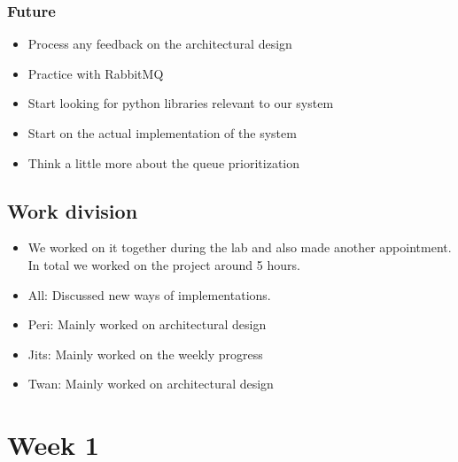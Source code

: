 \documentclass[a4paper]{article}
\begin{document}
\subsubsection*{Future}
\begin{itemize}
    \item Process any feedback on the architectural design
    \item Practice with RabbitMQ
	\item Start looking for python libraries relevant to our system
    \item Start on the actual implementation of the system
    \item Think a little more about the queue prioritization 
\end{itemize}

\subsection*{Work division}
\begin{itemize}
	\item We worked on it together during the lab and also made another appointment. In total we worked on the project around 5 hours. 
	\item All: Discussed new ways of implementations. 
    \item Peri: Mainly worked on architectural design
    \item Jits: Mainly worked on the weekly progress
    \item Twan: Mainly worked on architectural design
\end{itemize}

\section*{Week 1}
\end{document}
